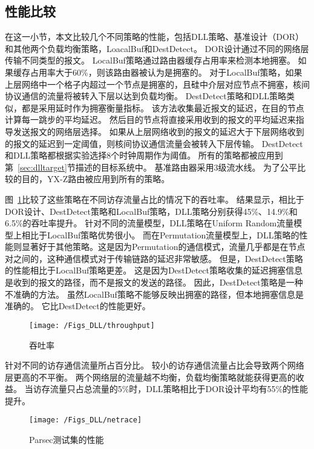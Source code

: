 \subsection{性能比较}

在这一小节，本文比较几个不同策略的性能，包括DLL策略、基准设计（DOR）和其他两个负载均衡策略，LoacalBuf和DestDetect。
DOR设计通过不同的网络层传输不同类型的报文。
LocalBuf策略通过路由器缓存占用率来检测本地拥塞。
如果缓存占用率大于60\%，则该路由器被认为是拥塞的。
对于LocalBuf策略，如果上层网络中一个格子内超过一个节点是拥塞的，且硅中介层对应节点不拥塞，核间协议通信的流量将被转入下层以达到负载均衡。
DestDetect策略和DLL策略类似，都是采用延时作为拥塞衡量指标。
该方法收集最近报文的延迟，在目的节点计算每一跳步的平均延迟。
然后目的节点将直接采用收到的报文的平均延迟来指导发送报文的网络层选择。
如果从上层网络收到的报文的延迟大于下层网络收到的报文的延迟到一定阈值，则核间协议通信流量会被转入下层传输。
DestDetect和DLL策略都根据实验选择8个时钟周期作为阈值。
所有的策略都被应用到第~\ref{sec:dlltarget}节描述的目标系统中。
基准路由器采用3级流水线。
为了公平比较的目的，YX-Z路由被应用到所有的策略。

图~\ref{fig:throughput}比较了这些策略在不同访存流量占比的情况下的吞吐率。
结果显示，相比于DOR设计、DestDetect策略和LocalBuf策略，DLL策略分别获得45\%、14.9\%和6.5\%的吞吐率提升。
针对不同的流量模型，DLL策略在Uniform Random流量模型上相比于LocalBuf策略优势很小。
而在Permutation流量模型上，DLL策略的性能则显著好于其他策略。这是因为Permutation的通信模式，流量几乎都是在节点对之间的，这种通信模式对于传输链路的延迟非常敏感。
但是，DestDetect策略的性能相比于LocalBuf策略更差。
这是因为DestDetect策略收集的延迟拥塞信息是收到的报文的路径，而不是报文的发送的路径。
因此，DestDetect策略是一种不准确的方法。
虽然LocalBuf策略不能够反映出拥塞的路径，但本地拥塞信息是准确的。
它比DestDetect的性能更好。


\begin{figure}[htbp] %
  \centering
  \texttt{[image: /Figs\_DLL/throughput]}
  \caption{吞吐率}
  \label{fig:throughput}
\end{figure}


针对不同的访存通信流量所占百分比。
较小的访存通信流量占比会导致两个网络层更高的不平衡。
两个网络层的流量越不均衡，负载均衡策略就能获得更高的收益。
当访存流量只占总流量的5\%时，DLL策略相比于DOR设计平均有55\%的性能提升。



\begin{figure}[htbp] %
  \centering
  \texttt{[image: /Figs\_DLL/netrace]}
  \caption{Parsec测试集的性能}
  \label{fig:netrace}
\end{figure}

